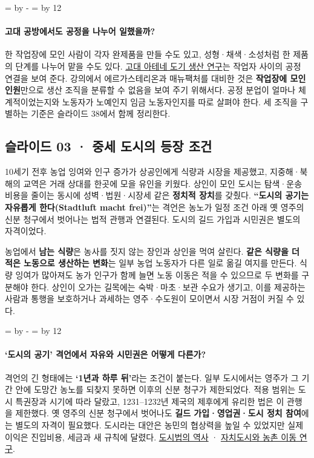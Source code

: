 \documentclass[10pt,a4paper]{article}
\newcommand{\ReserveQuestionSpace}{%
  \par\begingroup
  \dimen0=\pagegoal \advance\dimen0 by -\pagetotal
  \dimen2=\baselineskip \multiply\dimen2 by 12
  \ifdim\dimen0<\dimen2 \newpage\fi
  \endgroup}
\begin{document}
\ReserveQuestionSpace
\paragraph{고대 공방에서도 공정을 나누어 일했을까?}
한 작업장에 모인 사람이 각자 완제품을 만들 수도 있고, 성형·채색·소성처럼 한 제품의 단계를 나누어 맡을 수도 있다. \href{https://www.cambridge.org/core/journals/journal-of-hellenic-studies/article/professional-and-parttime-potters-and-painters-modelling-the-production-of-athenian-black-and-redfigure-painted-pottery/FD149DD27CB02B6890EE8F4CC7451613}{고대 아테네 도기 생산 연구}는 작업자 사이의 공정 연결을 보여 준다. 강의에서 에르가스테리온과 매뉴팩처를 대비한 것은 \textbf{작업장에 모인 인원}만으로 생산 조직을 분류할 수 없음을 보여 주기 위해서다. 공정 분업이 얼마나 체계적이었는지와 노동자가 노예인지 임금 노동자인지를 따로 살펴야 한다. 세 조직을 구별하는 기준은 슬라이드 38에서 함께 정리한다.\par

\subsection{슬라이드 03 · 중세 도시의 등장 조건}
10세기 전후 농업 잉여와 인구 증가가 상공인에게 식량과 시장을 제공했고, 지중해·북해의 교역은 거래 상대를 한곳에 모을 유인을 키웠다. 상인이 모인 도시는 탐색·운송 비용을 줄이는 동시에 성벽·법원·시장세 같은 \textbf{정치적 장치}를 갖췄다. \textbf{“도시의 공기는 자유롭게 한다(Stadtluft macht frei)”}는 격언은 농노가 일정 조건 아래 옛 영주의 신분 청구에서 벗어나는 법적 관행과 연결된다. 도시의 길드 가입과 시민권은 별도의 자격이었다.\par

농업에서 \textbf{남는 식량}은 농사를 짓지 않는 장인과 상인을 먹여 살린다. \textbf{같은 식량을 더 적은 노동으로 생산하는 변화}는 일부 농업 노동자가 다른 일로 옮길 여지를 만든다. 식량 잉여가 많아져도 농가 인구가 함께 늘면 노동 이동은 적을 수 있으므로 두 변화를 구분해야 한다. 상인이 오가는 길목에는 숙박·마초·보관 수요가 생기고, 이를 제공하는 사람과 통행을 보호하거나 과세하는 영주·수도원이 모이면서 시장 거점이 커질 수 있다.\par

\ReserveQuestionSpace
\paragraph{‘도시의 공기’ 격언에서 자유와 시민권은 어떻게 다른가?}
격언의 긴 형태에는 \textbf{‘1년과 하루 뒤’}라는 조건이 붙는다. 일부 도시에서는 영주가 그 기간 안에 도망간 농노를 되찾지 못하면 이후의 신분 청구가 제한되었다. 적용 범위는 도시 특권장과 시기에 따라 달랐고, 1231–1232년 제국의 제후에게 유리한 법은 이 관행을 제한했다. 옛 영주의 신분 청구에서 벗어나도 \textbf{길드 가입·영업권·도시 정치 참여}에는 별도의 자격이 필요했다. 도시라는 대안은 농민의 협상력을 높일 수 있었지만 실제 이익은 진입비용, 세금과 새 규칙에 달렸다. \href{https://hls-dhs-dss.ch/de/articles/008950/2017-10-11/}{도시법의 역사} · \href{https://academic.oup.com/ereh/article/25/2/203/5878823}{자치도시와 농촌 이동 연구}.\par
\end{document}
